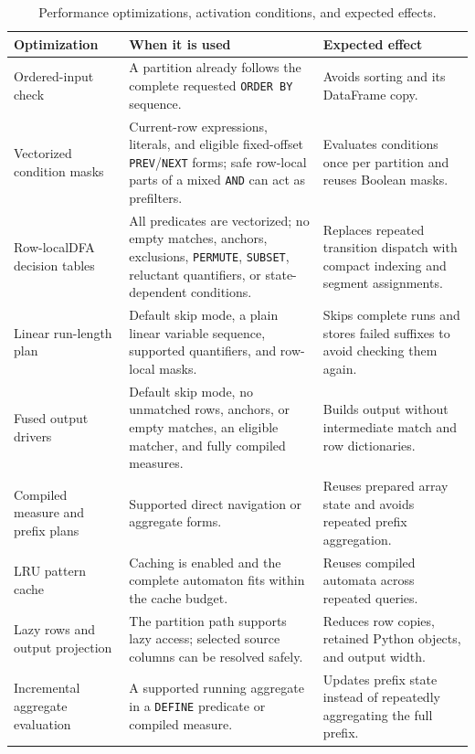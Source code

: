 \documentclass[preprint,12pt,times,a4paper]{elsarticle}
\begin{document}
\begin{table}[tbp]
\centering\footnotesize

\setlength{\tabcolsep}{3pt}
\renewcommand{\arraystretch}{1.12}
\begin{tabularx}{\textwidth}{@{}>{\raggedright\arraybackslash}p{}>{\raggedright\arraybackslash}p{}>{\raggedright\arraybackslash}X@{}}
\toprule
\textbf{Optimization} & \textbf{When it is used} & \textbf{Expected effect} \\
\midrule
Ordered-input check & A partition already follows the complete requested
\texttt{ORDER BY} sequence. & Avoids sorting and its DataFrame copy. \\
\addlinespace[3pt]
Vectorized condition masks & Current-row expressions, literals, and eligible
fixed-offset \texttt{PREV}/\texttt{NEXT} forms; safe row-local parts of a mixed
\texttt{AND} can act as prefilters. & Evaluates conditions once per partition
and reuses Boolean masks. \\
\addlinespace[3pt]
Row-local\newline DFA decision tables & All predicates are vectorized; no empty
matches, anchors, exclusions, \texttt{PERMUTE}, \texttt{SUBSET}, reluctant
quantifiers, or state-dependent conditions. & Replaces repeated transition
dispatch with compact indexing and segment assignments. \\
\addlinespace[3pt]
Linear run-length plan & Default skip mode, a plain linear variable sequence,
supported quantifiers, and row-local masks. & Skips complete runs and stores
failed suffixes to avoid checking them again. \\
\addlinespace[3pt]
Fused output drivers & Default skip mode, no unmatched rows, anchors, or empty
matches, an eligible matcher, and fully compiled measures. & Builds output
without intermediate match and row dictionaries. \\
\addlinespace[3pt]
Compiled measure and prefix plans & Supported direct navigation or aggregate
forms. & Reuses prepared array state and avoids repeated prefix aggregation. \\
\addlinespace[3pt]
LRU pattern cache & Caching is enabled and the complete automaton fits within
the cache budget. & Reuses compiled automata across repeated queries. \\
\addlinespace[3pt]
Lazy rows and output projection & The partition path supports lazy access;
selected source columns can be resolved safely. & Reduces row copies,
retained Python objects, and output width. \\
\addlinespace[3pt]
Incremental aggregate evaluation & A supported running aggregate in a
\texttt{DEFINE} predicate or compiled measure. & Updates prefix state instead
of repeatedly aggregating the full prefix. \\
\bottomrule
\end{tabularx}
\caption{Performance optimizations, activation conditions, and expected effects.}
\label{tab:performance_optimizations}
\end{table}
\end{document}
